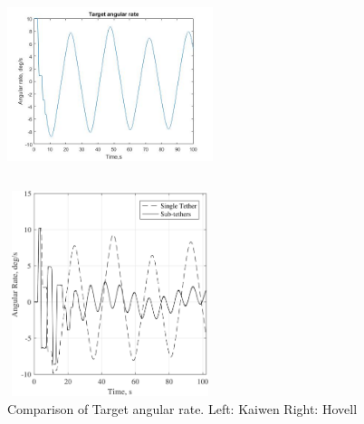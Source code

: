 \begin{figure}[htbp]
\centering
\begin{minipage}[t]{0.48\textwidth}
\centering
\includegraphics[width=6cm,height=6cm]{fig/simulation/ThrustStable/Targetangularrate.jpg}
\end{minipage}
\begin{minipage}[t]{0.48\textwidth}
\centering
\includegraphics[width=6cm,height=6cm]{fig/simulation/ThrustStable/Targetangularratesample.jpg}
\end{minipage}
\caption{Comparison of Target angular rate.		Left: Kaiwen	Right: Hovell}
\end{figure}
